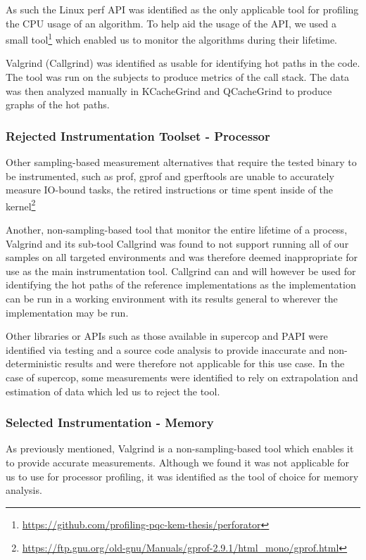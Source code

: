 As such the Linux perf API was identified as the only applicable tool for profiling the CPU usage of an algorithm. To help aid the usage of the API, we used a small tool\footnote{\href{https://github.com/profiling-pqc-kem-thesis/perforator}{https://github.com/profiling-pqc-kem-thesis/perforator}} which enabled us to monitor the algorithms during their lifetime.

Valgrind (Callgrind) was identified as usable for identifying hot paths in the code. The tool was run on the subjects to produce metrics of the call stack. The data was then analyzed manually in KCacheGrind and QCacheGrind to produce graphs of the hot paths.

\subsubsection{Rejected Instrumentation Toolset - Processor}
\label{section:method:experiment:phase1:rejected-toolset-processor}
Other sampling-based measurement alternatives that require the tested binary to be instrumented, such as prof, gprof and gperftools are unable to accurately measure IO-bound tasks, the retired instructions or time spent inside of the kernel\footnote{\href{https://ftp.gnu.org/old-gnu/Manuals/gprof-2.9.1/html\_mono/gprof.html}{https://ftp.gnu.org/old-gnu/Manuals/gprof-2.9.1/html\_mono/gprof.html}}

Another, non-sampling-based tool that monitor the entire lifetime of a process, Valgrind and its sub-tool Callgrind was found to not support running all of our samples on all targeted environments and was therefore deemed inappropriate for use as the main instrumentation tool. Callgrind can and will however be used for identifying the hot paths of the reference implementations as the implementation can be run in a working environment with its results general to wherever the implementation may be run.

Other libraries or APIs such as those available in \gls{supercop} and PAPI were identified via testing and a source code analysis to provide inaccurate and non-deterministic results and were therefore not applicable for this use case. In the case of \gls{supercop}, some measurements were identified to rely on extrapolation and estimation of data which led us to reject the tool.

\subsubsection{Selected Instrumentation - Memory}
\label{section:method:experiment:phase1:selected-toolset-memory}
As previously mentioned, Valgrind is a non-sampling-based tool which enables it to provide accurate measurements. Although we found it was not applicable for us to use for processor profiling, it was identified as the tool of choice for memory analysis.

